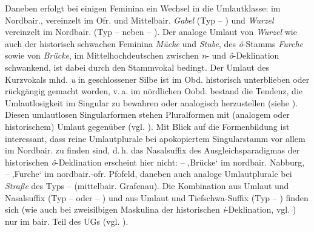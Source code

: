 Daneben erfolgt bei einigen Feminina ein Wechsel in die Umlautklasse: im Nordbair., vereinzelt im Ofr. und Mittelbair. \textit{Gabel} (Typ  -- ) und \textit{Wurzel} vereinzelt im Nordbair. (Typ  --  neben  -- ). Der analoge Umlaut von \textit{Wurzel} wie auch der historisch schwachen Feminina \textit{Mücke} und \textit{Stube}, des \textit{ô}{}-Stamms \textit{Furche} sowie von \textit{Brücke}, im Mittelhochdeutschen zwischen \textit{n}{}- und \textit{ô}{}-Deklination schwankend, ist dabei durch den Stammvokal bedingt. Der Umlaut des Kurzvokals mhd. \textit{u} in geschlossener Silbe ist im Obd. historisch unterblieben oder rückgängig gemacht worden, v.\,a. im nördlichen Oobd. bestand die Tendenz, die Umlautlosigkeit im Singular zu bewahren oder analogisch herzustellen (siehe ). Diesen umlautlosen Singularformen stehen Pluralformen mit (analogem oder historischem) Umlaut gegenüber (vgl. 	). Mit Blick auf die Formenbildung ist interessant, dass reine Umlautplurale bei apokopiertem Singularstamm vor allem im Nordbair. zu finden sind, d.\,h. das Nasalsuffix des Ausgleichsparadigmas der historischen \textit{ô}{}-Deklination erscheint hier nicht:  --  ‚Brücke‘ im nordbair. Nabburg,  --  ‚Furche‘ im nordbair.-ofr. Pfofeld, daneben auch analoge Umlautplurale bei \textit{Straße} des Typs  --  (mittelbair. Grafenau). Die Kombination aus Umlaut und Nasalsuffix (Typ  --  oder  -- ) und aus Umlaut und Tiefschwa-Suffix (Typ  -- ) finden sich (wie auch bei zweisilbigen Maskulina der historischen \textit{i}{}-Deklination, vgl. ) nur im bair. Teil des UGs (vgl. \citealt[§864]{Schmeller1821}).


